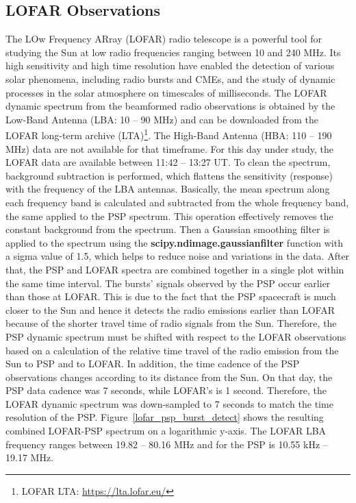 \subsection{LOFAR Observations}
The LOw Frequency ARray (LOFAR) radio telescope \citep{lofar_2013} is a powerful tool for studying the Sun at low radio frequencies ranging between 10 and 240 MHz. Its high sensitivity and high time resolution have enabled the detection of various solar phenomena, including radio bursts and CMEs, and the study of dynamic processes in the solar atmosphere on timescales of milliseconds.
The LOFAR dynamic spectrum from the beamformed radio observations is obtained by the Low-Band Antenna (LBA: 10 – 90 MHz) and can be downloaded from the LOFAR long-term archive (LTA)\footnote{LOFAR LTA: \url{https://lta.lofar.eu/}}. The High-Band Antenna (HBA: 110 – 190 MHz) data are not available for that timeframe. For this day under study, the LOFAR data are available between 11:42 – 13:27 UT. To clean the spectrum, background subtraction is performed, which flattens the sensitivity (response) with the frequency of the LBA antennas. Basically, the mean spectrum along each frequency band is calculated and subtracted from the whole frequency band, the same applied to the PSP spectrum. This operation effectively removes the constant background from the spectrum. Then a Gaussian smoothing filter is applied to the spectrum using the \textbf{scipy.ndimage.gaussian\textunderscore filter} function with a sigma value of 1.5, which helps to reduce noise and variations in the data.
After that, the PSP and LOFAR spectra are combined together in a single plot within the same time interval. The bursts’ signals observed by the PSP occur earlier than those at LOFAR. This is due to the fact that the PSP spacecraft is much closer to the Sun and hence it detects the radio emissions earlier than LOFAR because of the shorter travel time of radio signals from the Sun. Therefore, the PSP dynamic spectrum must be shifted with respect to the LOFAR observations based on a calculation of the relative time travel of the radio emission from the Sun to PSP and to LOFAR. In addition, the time cadence of the PSP observations changes according to its distance from the Sun. On that day, the PSP data cadence was 7 seconds, while LOFAR’s is 1 second. Therefore, the LOFAR dynamic spectrum was down-sampled to 7 seconds to match the time resolution of the PSP. Figure~\ref{lofar_psp_burst_detect} shows the resulting combined LOFAR-PSP spectrum on a logarithmic y-axis.
The LOFAR LBA frequency ranges between 19.82 -- 80.16 MHz and for the PSP is 10.55 kHz -- 19.17 MHz.

